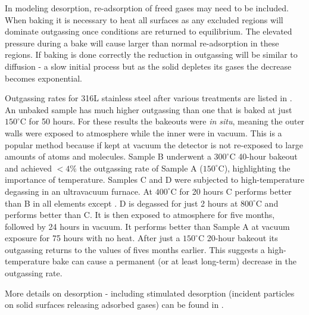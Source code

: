 In modeling desorption, re-adsorption of freed gases may need to be included.  When baking it is necessary to heat all surfaces as
any excluded regions will dominate outgassing once conditions are returned to equilibrium.  The elevated pressure during a bake will
cause larger than normal re-adsorption in these regions.  If baking is done correctly the reduction in
outgassing will be similar to diffusion - a slow initial process but as the solid depletes its gases the decrease becomes
exponential.

Outgassing rates for 316L stainless steel after various treatments are listed in
 .  An unbaked sample has
much higher outgassing than one that is baked at just $150^{\circ}\mathrm{C}$ for 50 hours.  For these results the bakeouts were
\textit{in situ}, meaning the outer walls were exposed to atmosphere while the inner were in vacuum.  This is a popular method because
if kept at vacuum the detector is not re-exposed to large amounts of atoms and molecules.  Sample B underwent a $300^{\circ}\mathrm{C}$
40-hour bakeout and achieved $<4\%$ the  outgassing rate of Sample A ($150^{\circ}\mathrm{C}$), highlighting the importance of
temperature.  Samples C and D
were subjected to high-temperature degassing in an ultravacuum furnace.  At $400^{\circ}\mathrm{C}$ for 20 hours C performs better than B
in all elements except .  D is degassed for just 2 hours at $800^{\circ}\mathrm{C}$ and performs better than C.  It is then
exposed to atmosphere for five months, followed by 24 hours in vacuum.  It performs better than Sample A at vacuum exposure for 75 hours
with no heat.  After just a $150^{\circ}\mathrm{C}$ 20-hour bakeout its outgassing returns to the values of fives months
earlier.  This suggests a high-temperature bake can cause a permanent (or at least long-term) decrease in the outgassing rate.

More details on desorption - including stimulated desorption (incident particles on solid surfaces releasing adsorbed gases) can be
found in .



